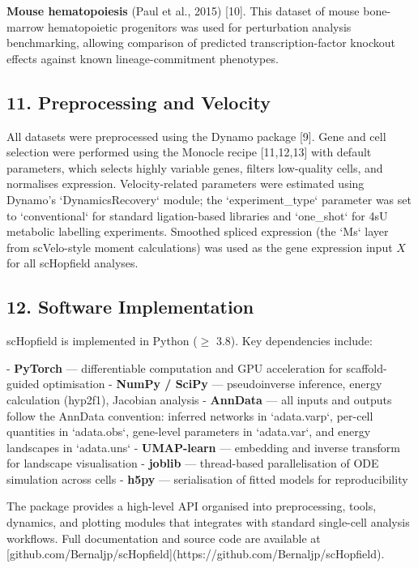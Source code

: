 \documentclass[11pt]{article}
\begin{document}
\textbf{Mouse hematopoiesis} (Paul et al., 2015) [10]. This dataset of mouse bone-marrow hematopoietic progenitors was used for perturbation analysis benchmarking, allowing comparison of predicted transcription-factor knockout effects against known lineage-commitment phenotypes.



\subsection*{11. Preprocessing and Velocity}

All datasets were preprocessed using the Dynamo package [9]. Gene and cell selection were performed using the Monocle recipe [11,12,13] with default parameters, which selects highly variable genes, filters low-quality cells, and normalises expression. Velocity-related parameters were estimated using Dynamo's `DynamicsRecovery` module; the `experiment\_type` parameter was set to `conventional` for standard ligation-based libraries and `one\_shot` for 4sU metabolic labelling experiments. Smoothed spliced expression (the `Ms` layer from scVelo-style moment calculations) was used as the gene expression input $X$ for all scHopfield analyses.



\subsection*{12. Software Implementation}

scHopfield is implemented in Python ($\geq$ 3.8). Key dependencies include:

- \textbf{PyTorch} — differentiable computation and GPU acceleration for scaffold-guided optimisation
- \textbf{NumPy / SciPy} — pseudoinverse inference, energy calculation (hyp2f1), Jacobian analysis
- \textbf{AnnData} — all inputs and outputs follow the AnnData convention: inferred networks in `adata.varp`, per-cell quantities in `adata.obs`, gene-level parameters in `adata.var`, and energy landscapes in `adata.uns`
- \textbf{UMAP-learn} — embedding and inverse transform for landscape visualisation
- \textbf{joblib} — thread-based parallelisation of ODE simulation across cells
- \textbf{h5py} — serialisation of fitted models for reproducibility

The package provides a high-level API organised into preprocessing, tools, dynamics, and plotting modules that integrates with standard single-cell analysis workflows. Full documentation and source code are available at [github.com/Bernaljp/scHopfield](https://github.com/Bernaljp/scHopfield).
\end{document}
